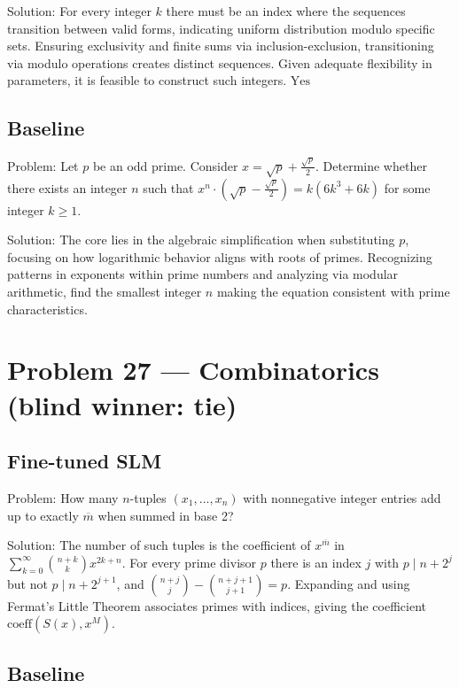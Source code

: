 \documentclass[11pt]{article}
\begin{document}
Solution:
For every integer $k$ there must be an index where the sequences transition between valid forms, indicating uniform distribution modulo specific sets. Ensuring exclusivity and finite sums via inclusion-exclusion, transitioning via modulo operations creates distinct sequences. Given adequate flexibility in parameters, it is feasible to construct such integers. $\boxed{\text{Yes}}$

\subsection*{Baseline}

Problem:
Let $p$ be an odd prime. Consider $x = \sqrt{p} + \frac{\sqrt{p}}{2}$. Determine whether there exists an integer $n$ such that $x^n \cdot (\sqrt{p} - \frac{\sqrt{p}}{2}) = k(6k^3 + 6k)$ for some integer $k \geq 1$.

Solution:
The core lies in the algebraic simplification when substituting $p$, focusing on how logarithmic behavior aligns with roots of primes. Recognizing patterns in exponents within prime numbers and analyzing via modular arithmetic, find the smallest integer $n$ making the equation consistent with prime characteristics.

\section*{Problem 27 --- Combinatorics \quad(blind winner: tie)}

\subsection*{Fine-tuned SLM}

Problem:
How many $n$-tuples $(x_1,\ldots,x_n)$ with nonnegative integer entries add up to exactly $\overline{m}$ when summed in base 2?

Solution:
The number of such tuples is the coefficient of $x^{\overline m}$ in $\sum_{k=0}^\infty \binom{n+k}k x^{2k+n}$. For every prime divisor $p$ there is an index $j$ with $p\mid n+2^j$ but not $p\mid n+2^{j+1}$, and $\binom{n+j}j-\binom{n+j+1}{j+1}=p$. Expanding and using Fermat's Little Theorem associates primes with indices, giving the coefficient $\text{coeff}(S(x),x^M)$.

\subsection*{Baseline}
\end{document}
